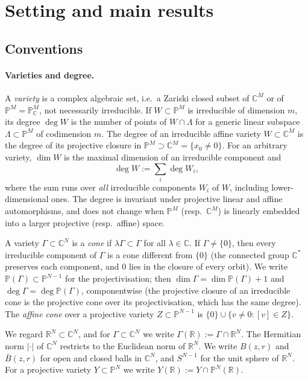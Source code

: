 \documentclass[11pt]{article}
\theoremstyle{definition}
\numberwithin{equation}{section}
\newcommand{\R}{\mathbb{R}}
\newcommand{\C}{\mathbb{C}}
\newcommand{\PP}{\mathbb{P}}
\begin{document}
\tableofcontents

\section{Setting and main results}\label{sec:setting}

\subsection{Conventions}

\paragraph{Varieties and degree.}
A \emph{variety} is a complex algebraic set, i.e.\ a Zariski closed subset of $\C^M$ or of $\PP^M=\PP^M_\C$, not necessarily irreducible. If $W\subset\PP^M$ is irreducible of dimension $m$, its degree $\deg W$ is the number of points of $W\cap\Lambda$ for a generic linear subspace $\Lambda\subset\PP^M$ of codimension $m$. The degree of an irreducible affine variety $W\subset\C^M$ is the degree of its projective closure in $\PP^M\supset\C^M=\{x_0\neq0\}$. For an arbitrary variety, $\dim W$ is the maximal dimension of an irreducible component and
\[
\deg W:=\sum_{i}\deg W_i,
\]
where the sum runs over \emph{all} irreducible components $W_i$ of $W$, including lower-dimensional ones. The degree is invariant under projective linear and affine automorphisms, and does not change when $\PP^M$ (resp.\ $\C^M$) is linearly embedded into a larger projective (resp.\ affine) space.

A variety $\Gamma\subset\C^N$ is a \emph{cone} if $\lambda\Gamma\subset\Gamma$ for all $\lambda\in\C$. If $\Gamma\neq\{0\}$, then every irreducible component of $\Gamma$ is a cone different from $\{0\}$ (the connected group $\C^*$ preserves each component, and $0$ lies in the closure of every orbit). We write $\PP(\Gamma)\subset\PP^{N-1}$ for the projectivisation; then $\dim\Gamma=\dim\PP(\Gamma)+1$ and $\deg\Gamma=\deg\PP(\Gamma)$, componentwise (the projective closure of an irreducible cone is the projective cone over its projectivisation, which has the same degree). The \emph{affine cone} over a projective variety $Z\subset\PP^{N-1}$ is $\{0\}\cup\{v\neq0:[v]\in Z\}$.

We regard $\R^N\subset\C^N$, and for $\Gamma\subset\C^N$ we write $\Gamma(\R):=\Gamma\cap\R^N$. The Hermitian norm $|\cdot|$ of $\C^N$ restricts to the Euclidean norm of $\R^N$. We write $B(z,r)$ and $\bar B(z,r)$ for open and closed balls in $\C^N$, and $S^{N-1}$ for the unit sphere of $\R^N$. For a projective variety $Y\subset\PP^N$ we write $Y(\R):=Y\cap\PP^N(\R)$.
\end{document}
